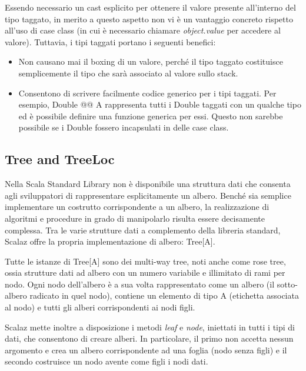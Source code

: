 

Essendo necessario un cast esplicito per ottenere il valore presente all'interno del tipo taggato, in merito a questo aspetto non vi è un vantaggio concreto rispetto all'uso di case class (in cui è necessario chiamare \textit{object.value} per accedere al valore). Tuttavia, i tipi taggati portano i seguenti benefici:

\begin{itemize}
\item Non causano mai il boxing di un valore, perché il tipo taggato costituisce semplicemente il tipo che sarà associato al valore sullo stack.
\item Consentono di scrivere facilmente codice generico per i tipi taggati. Per esempio, Double @@ A rappresenta tutti i Double taggati con un qualche tipo ed è possibile definire una funzione generica per essi. Questo non sarebbe possibile se i Double fossero incapsulati in delle case class.
\end{itemize}

\subsection{Tree and TreeLoc}

Nella Scala Standard Library non è disponibile una struttura dati che consenta agli sviluppatori di rappresentare esplicitamente un albero. Benché sia semplice implementare un costrutto corrispondente a un albero, la realizzazione di algoritmi e procedure in grado di manipolarlo risulta essere decisamente complessa. Tra le varie strutture dati a complemento della libreria standard, Scalaz offre la propria implementazione di albero: Tree[A].

Tutte le istanze di Tree[A] sono dei multi-way tree, noti anche come rose tree, ossia strutture dati ad albero con un numero variabile e illimitato di rami per nodo. Ogni nodo dell'albero è a sua volta rappresentato come un albero (il sotto-albero radicato in quel nodo), contiene un elemento di tipo A (etichetta associata al nodo) e tutti gli alberi corrispondenti ai nodi figli.

Scalaz mette inoltre a disposizione i metodi \textit{leaf} e \textit{node}, iniettati in tutti i tipi di dati, che consentono di creare alberi. In particolare, il primo non accetta nessun argomento e crea un albero corrispondente ad una foglia (nodo senza figli) e il secondo costruisce un nodo avente come figli i nodi dati.

